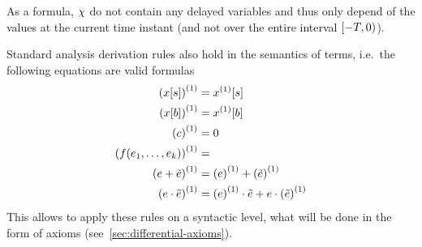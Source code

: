     As a \FOLR formula, $\chi$ do not contain any delayed variables and thus only depend of the values at the current time instant (and not over the entire interval $[-T,0)$).

    \begin{lemma}[Derivations]\label{lm:derivations}
        Standard analysis derivation rules also hold in the semantics of \ddL terms, i.e.\ the following equations are valid \ddL formulas
        \begin{align}
            \D{(\x[s])} &= \Dx[s]\\
            \D{(\x[b])} &= \Dx[b]\\
            \D{(c)} &= 0\\
            \D{(f(\range{\istrm{1}}{\istrm{k}}))} &=\\
            \D{(\astrm+\bstrm)} &= \D{(\astrm)}+\D{(\bstrm)}\\
            \D{(\astrm\cdot\bstrm)} &= \D{(\astrm)}\cdot\bstrm + \astrm\cdot\D{(\bstrm)}\\
        \end{align}
        This allows to apply these rules on a syntactic level, what will be done in the form of axioms (see~\ref{sec:differential-axioms}).
    \end{lemma}
